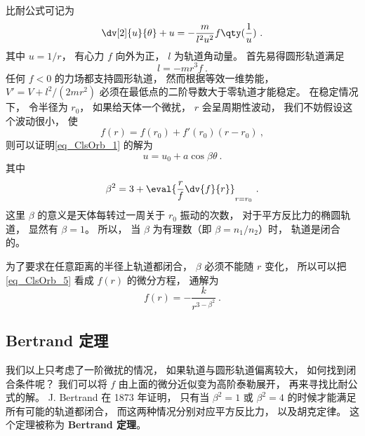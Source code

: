 

比耐公式可记为
\begin{equation}\label{eq_ClsOrb_1}
\dv[2]{u}{\theta} + u = -\frac{m}{l^2 u^2} f\qty(\frac 1u)~.
\end{equation}
其中 $u = 1/r$， 有心力 $f$ 向外为正， $l$ 为轨道角动量。 首先易得圆形轨道满足
\begin{equation}
l = - m r^3 f~.
\end{equation}
任何 $f < 0$ 的力场都支持圆形轨道， 然而根据等效一维势能， $V' = V + l^2/(2mr^2)$ 必须在最低点的二阶导数大于零轨道才能稳定。 在稳定情况下， 令半径为 $r_0$， 如果给天体一个微扰， $r$ 会呈周期性波动， 我们不妨假设这个波动很小， 使
\begin{equation}
f(r) = f(r_0) + f'(r_0)(r-r_0)~,
\end{equation}
则可以证明\autoref{eq_ClsOrb_1} 的解为
\begin{equation}
u = u_0 + a\cos\beta\theta~.
\end{equation}
其中
\begin{equation}\label{eq_ClsOrb_5}
\beta^2 = 3 + \eval{\frac rf \dv{f}{r}}_{r = r_0}~.
\end{equation}
这里 $\beta$ 的意义是天体每转过一周关于 $r_0$ 振动的次数， 对于平方反比力的椭圆轨道， 显然有 $\beta = 1$。 所以， 当 $\beta$ 为有理数（即 $\beta = n_1/n_2$）时， 轨道是闭合的。

为了要求在任意距离的半径上轨道都闭合，  $\beta$ 必须不能随 $r$ 变化， 所以可以把\autoref{eq_ClsOrb_5} 看成 $f(r)$ 的微分方程， 通解为
\begin{equation}
f(r) = - \frac{k}{r^{3-\beta^2}}~.
\end{equation}

\subsection{Bertrand 定理}
我们以上只考虑了一阶微扰的情况， 如果轨道与圆形轨道偏离较大， 如何找到闭合条件呢？ 我们可以将 $f$ 由上面的微分近似变为高阶泰勒展开， 再来寻找比耐公式的解。 J. Bertrand 在 1873 年证明， 只有当 $\beta^2 = 1$ 或 $\beta^2 = 4$ 的时候才能满足所有可能的轨道都闭合， 而这两种情况分别对应平方反比力， 以及胡克定律。 这个定理被称为 \textbf{Bertrand 定理}。